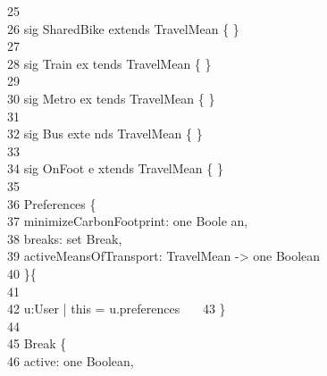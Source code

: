 \-    \ 25      \qquad \\
\-    \ 26       {\color{blue}sig} SharedBike {\color{bl                                                 ue}extends} TravelMean \{ \}\\
\-    \ 27      \qquad \\
\-    \ 28       {\color{blue}sig} Train {\color{blue}ex                                                 tends} TravelMean \{ \}\\
\-    \ 29      \qquad \\
\-    \ 30       {\color{blue}sig} Metro {\color{blue}ex                                                 tends} TravelMean \{ \}\\
\-    \ 31      \qquad \\
\-    \ 32       {\color{blue}sig} Bus {\color{blue}exte                                                 nds} TravelMean \{ \}\\
\-    \ 33      \qquad \\
\-    \ 34       {\color{blue}sig} OnFoot {\color{blue}e                                                 xtends} TravelMean \{ \}\\
\-    \ 35      \qquad \\
\-    \ 36       Preferences \{\\
\-    \ 37      \qquad \-\qquad minimizeCarbonFootprint: {\color{blue}one} Boole                                                 an,\\
\-    \ 38      \qquad \-\qquad breaks: {\color{blue}set} Break,\\
\-    \ 39      \qquad \-\qquad activeMeansOfTransport: TravelMean -> {\color{bl                                                 ue}one} Boolean\\
\-    \ 40      \qquad \}\{\\
\-    \ 41      \qquad \-\\
\-    \ 42      \qquad \- u:User | this = u.preferences\                                                 \
\-    \ 43      \qquad \}\\
\-    \ 44      \qquad \\
\-    \ 45       Break \{\\
\-    \ 46      \qquad \-\qquad active: {\color{blue}one} Boolean,\\
